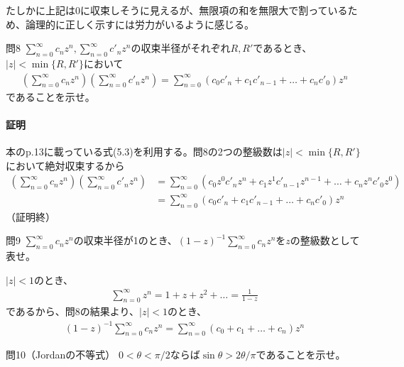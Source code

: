 たしかに上記は0に収束しそうに見えるが、無限項の和を無限大で割っているため、論理的に正しく示すには労力がいるように感じる。
\begin{mysimplebox}{問8}
    $\displaystyle\sum_{n=0}^{\infty}c_nz^n, \sum_{n=0}^{\infty}c'_nz^n$の収束半径がそれぞれ$R, R'$であるとき、$|z|<\min\{R, R'\}$において
    \begin{align*}
        \left(\sum_{n=0}^{\infty}c_nz^n\right)\left(\sum_{n=0}^{\infty}c'_nz^n\right)
        =\sum_{n=0}^{\infty}(c_0c'_n+c_1c'_{n-1}+\dots+c_nc'_0)z^n
    \end{align*}
    であることを示せ。
\end{mysimplebox}
\paragraph{証明}
本のp.13に載っている式(5.3)を利用する。問8の2つの整級数は$|z|<\min\{R, R'\}$において絶対収束するから
\begin{align*}
    \left(\sum_{n=0}^{\infty}c_nz^n\right)\left(\sum_{n=0}^{\infty}c'_nz^n\right)
    &=\sum_{n=0}^{\infty}(c_0z^0c'_nz^n+c_1z^1c'_{n-1}z^{n-1}+\dots+c_nz^nc'_0z^0)\\
    &=\sum_{n=0}^{\infty}(c_0c'_n+c_1c'_{n-1}+\dots+c_nc'_0)z^n
\end{align*}
（証明終）

\begin{mysimplebox}{問9}
    $\displaystyle\sum_{n=0}^{\infty}c_nz^n$の収束半径が1のとき、$\displaystyle(1-z)^{-1}\sum_{n=0}^{\infty}c_nz^n$を$z$の整級数として表せ。
\end{mysimplebox}
$|z|<1$のとき、
\begin{align*}
    \sum_{n=0}^{\infty}z^n=1+z+z^2+\dots=\frac{1}{1-z}
\end{align*}
であるから、問8の結果より、$|z|<1$のとき、
\begin{align*}
    (1-z)^{-1}\sum_{n=0}^{\infty}c_nz^n=\sum_{n=0}^{\infty}(c_0+c_1+\dots+c_n)z^n
\end{align*}

\begin{mysimplebox}{問10（Jordanの不等式）}
    $0<\theta<\pi/2$ならば$\sin\theta>2\theta/\pi$であることを示せ。
\end{mysimplebox}
